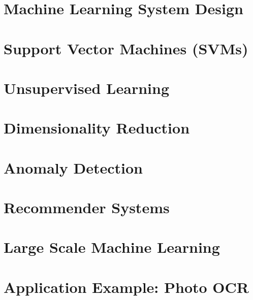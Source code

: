 \documentclass{article}
\begin{document}
    \section{Machine Learning System Design}
    \section{Support Vector Machines (SVMs)}
    \section{Unsupervised Learning}
    \section{Dimensionality Reduction}
    \section{Anomaly Detection}
    \section{Recommender Systems}
    \section{Large Scale Machine Learning}
    \section{Application Example: Photo OCR}
\end{document}

